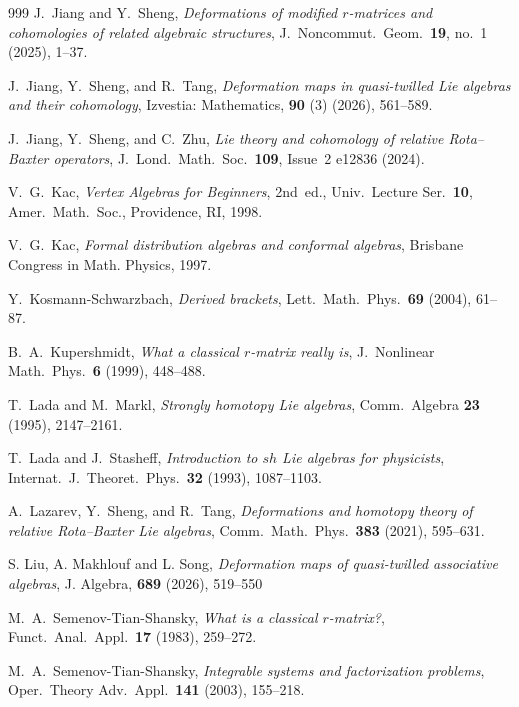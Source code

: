 \documentclass[a4paper,11pt]{article}
\numberwithin{equation}{section}
\begin{document}
\begin{thebibliography}{999}
J.~Jiang and Y.~Sheng,
\emph{Deformations of modified $r$-matrices and cohomologies of related
algebraic structures},
J.\ Noncommut.\ Geom.\ \textbf{19}, no.~1 (2025), 1--37.

J.~Jiang, Y.~Sheng, and R.~Tang,
\textit{Deformation maps in quasi-twilled Lie algebras and their cohomology},
Izvestia: Mathematics, \textbf{90} (3) (2026), 561--589.

J.~Jiang, Y.~Sheng, and C.~Zhu,
\emph{Lie theory and cohomology of relative Rota--Baxter operators},
J.\ Lond.\ Math.\ Soc.\ \textbf{109}, Issue~2 e12836 (2024).

V.~G.~Kac,
\emph{Vertex Algebras for Beginners}, 2nd~ed.,
Univ.\ Lecture Ser.\ \textbf{10},
Amer.\ Math.\ Soc., Providence, RI, 1998.

  V.~G.~Kac, \emph{Formal distribution algebras and conformal algebras}, Brisbane Congress in Math. Physics,
1997.

Y.~Kosmann-Schwarzbach,
\emph{Derived brackets},
Lett.\ Math.\ Phys.\ \textbf{69} (2004), 61--87.

B.~A.~Kupershmidt,
\emph{What a classical $r$-matrix really is},
J.\ Nonlinear Math.\ Phys.\ \textbf{6} (1999), 448--488.

T.~Lada and M.~Markl,
\emph{Strongly homotopy Lie algebras},
Comm.\ Algebra \textbf{23} (1995), 2147--2161.

T.~Lada and J.~Stasheff,
\emph{Introduction to $sh$ Lie algebras for physicists},
Internat.\ J.\ Theoret.\ Phys.\ \textbf{32} (1993), 1087--1103.

A.~Lazarev, Y.~Sheng, and R.~Tang,
\emph{Deformations and homotopy theory of relative Rota--Baxter Lie
algebras},
Comm.\ Math.\ Phys.\ \textbf{383} (2021), 595--631.

S. Liu, A. Makhlouf and L. Song,
\emph{Deformation maps of quasi-twilled associative algebras},
J. Algebra, \textbf{689} (2026), 519--550

M.~A.~Semenov-Tian-Shansky,
\emph{What is a classical $r$-matrix?},
Funct.\ Anal.\ Appl.\ \textbf{17} (1983), 259--272.

M.~A.~Semenov-Tian-Shansky,
\emph{Integrable systems and factorization problems},
Oper.\ Theory Adv.\ Appl.\ \textbf{141} (2003), 155--218.


\end{thebibliography}
\end{document}
